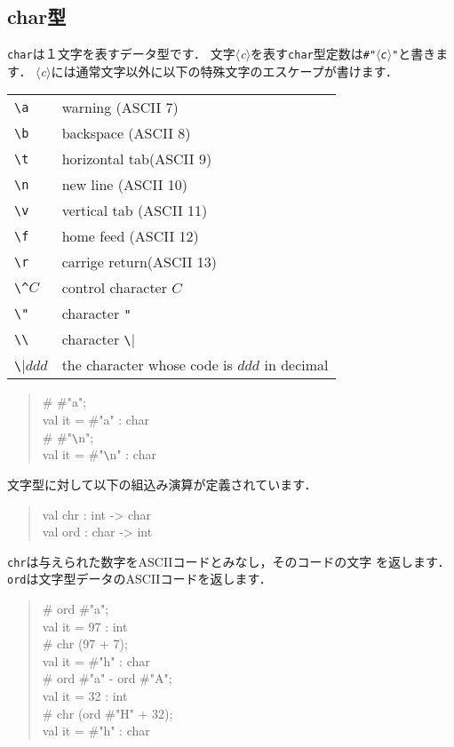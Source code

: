 \documentclass{jbook}
\newcommand{\nonterm}[1]{\mbox{$\langle$}{\it #1}\mbox{$\rangle$}}
\newenvironment{program}{\begin{quote}\begin{tt}}%
                        {\end{tt}\end{quote}}
\begin{document}
\subsection{char型}
	{\tt char}は１文字を表すデータ型です．
	文字\nonterm{c}を表す{\tt char}型定数は{\tt \#"\nonterm{c}"}と書きます．
	\nonterm{c}には通常文字以外に以下の特殊文字のエスケープが書けます．
\begin{center}
\begin{tabular}{|l|l|}
\hline
\verb|\a| & {warning (ASCII 7)}\\
\verb|\b| & {backspace (ASCII 8)}\\
\verb|\t| & {horizontal tab(ASCII 9)}\\
\verb|\n| & {new line (ASCII 10)}\\
\verb|\v| & {vertical tab (ASCII 11)}\\
\verb|\f| & {home feed (ASCII 12)}\\
\verb|\r| & {carrige return(ASCII 13)}\\
\verb|\^|$C$ & {control character $C$}\\
\verb|\"| & {character {\tt \verb|"|}}\\ %
\verb|\\| & {character \verb|\|}\\
\verb|\|$ddd$ &  {the character whose code is $ddd$ in decimal}
\\\hline
\end{tabular}
\end{center}
\begin{program}
\# \#"a";\\
val it = \#"a" : char\\
\# \#"\verb|\|n";\\
val it = \#"\verb|\|n" : char
\end{program}
	文字型に対して以下の組込み演算が定義されています．
\begin{program}
val chr : int -> char\\
val ord : char -> int
\end{program}
	{\tt chr}は与えられた数字をASCIIコードとみなし，そのコードの文字
を返します．
	{\tt ord}は文字型データのASCIIコードを返します．
\begin{program}
\# ord \#"a";\\
val it = 97 : int\\
\# chr (97 + 7);\\
val it = \#"h" : char\\
\# ord \#"a" - ord \#"A";\\
val it = 32 : int\\
\# chr (ord \#"H" + 32);\\
val it = \#"h" : char
\end{program}
\end{document}

